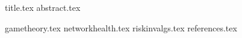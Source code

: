 \documentclass[11pt]{llncs}
\begin{document}
  {title.tex}
  \thispagestyle{plain}
  {abstract.tex}

  {gametheory.tex}
  {networkhealth.tex}
  {riskinvalgs.tex}
  {references.tex}
\end{document}
